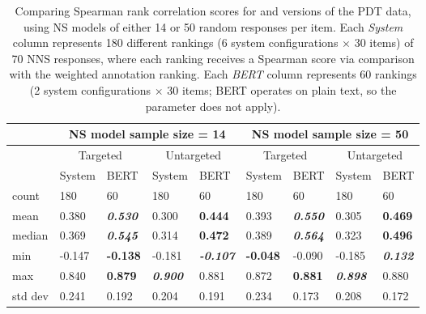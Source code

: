 \begin{table}[htb!]
\begin{center}
\begin{tabular}{|l||l|l||l|l||l|l||l|l|}
\hline
& \multicolumn{4}{c||}{NS model sample size = 14} & \multicolumn{4}{c|}{NS model sample size = 50} \\
\hline
 & \multicolumn{2}{c||}{Targeted} & \multicolumn{2}{c||}{Untargeted} & \multicolumn{2}{c||}{Targeted} & \multicolumn{2}{c|}{Untargeted} \\
\hline
	& System 		& BERT 		& System 	& BERT 								& System 		& BERT 						& System 		& BERT \\
\hline
count 	& 180 		& 60 		& 180 		& 60 								& 180 			& 60 						& 180 			& 60 \\
\hline
mean 	& 0.380 	& \textit{\textbf{0.530}} 	& 0.300 	& \textbf{0.444} 	& 0.393 		& \textit{\textbf{0.550}} 	& 0.305 		& \textbf{0.469}  \\
\hline
median 	& 0.369 	& \textit{\textbf{0.545}} 	& 0.314 	& \textbf{0.472} 	& 0.389 		& \textit{\textbf{0.564}} 	& 0.323			& \textbf{0.496} \\
\hline
min & -0.147 	& \textbf{-0.138} & -0.181 	& \textit{\textbf{-0.107}} 			& \textbf{-0.048} & -0.090					& -0.185 		& \textit{\textbf{0.132}} \\
\hline
max 	& 0.840 	& \textbf{0.879} 	& \textit{\textbf{0.900}}	& 0.881 	& 0.872 		& \textbf{0.881}			& \textit{\textbf{0.898}} 	& 0.880 \\
\hline
std dev 	& 0.241 	& 0.192 	& 0.204 	& 0.191 						& 0.234 		& 0.173						& 0.208 		& 0.172 \\
\hline
\end{tabular}
\caption{\label{tab:targeting-results} Comparing Spearman rank correlation scores for  and  versions of the PDT data, using NS models of either 14 or 50 random responses per item. Each \textit{System} column represents 180 different rankings (6 system configurations $\times$ 30 items) of 70 NNS responses, where each ranking receives a Spearman score via comparison with the weighted annotation ranking. Each \textit{BERT} column represents 60 rankings (2 system configurations $\times$ 30 items; BERT operates on plain text, so the  parameter does not apply).
}
\end{center}
\end{table}



